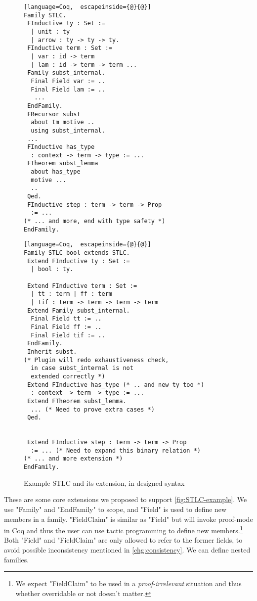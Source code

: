 \begin{figure}[!htb]
  \begin{minipage}[t]{0.47\linewidth}
\begin{lstlisting}[language=Coq,  escapeinside={@}{@}]
Family STLC.
 FInductive ty : Set :=
  | unit : ty
  | arrow : ty -> ty -> ty.
 FInductive term : Set := 
  | var : id -> term 
  | lam : id -> term -> term ...
 Family subst_internal.
  Final Field var := ..
  Final Field lam := ..
   ...
 EndFamily.
 FRecursor subst
  about tm motive ..
  using subst_internal.
 ...
 FInductive has_type 
  : context -> term -> type := ...
 FTheorem subst_lemma 
  about has_type 
  motive ...
  ..
 Qed.
 FInductive step : term -> term -> Prop 
  := ...
(* ... and more, end with type safety *)
EndFamily.
\end{lstlisting}
  \end{minipage}
  \begin{minipage}[t]{0.47\linewidth}
\begin{lstlisting}[language=Coq,  escapeinside={@}{@}]
Family STLC_bool extends STLC.
 Extend FInductive ty : Set :=
  | bool : ty.

 Extend FInductive term : Set := 
  | tt : term | ff : term 
  | tif : term -> term -> term -> term
 Extend Family subst_internal.
  Final Field tt := ..
  Final Field ff := ..
  Final Field tif := ..
 EndFamily.
 Inherit subst.
(* Plugin will redo exhaustiveness check, 
  in case subst_internal is not 
  extended correctly *)
 Extend FInductive has_type (* .. and new ty too *)
  : context -> term -> type := ...
 Extend FTheorem subst_lemma.
  ... (* Need to prove extra cases *)
 Qed.


 Extend FInductive step : term -> term -> Prop 
  := ... (* Need to expand this binary relation *)
(* ... and more extension *)
EndFamily.
\end{lstlisting}
  \end{minipage}
  \caption{Example STLC and its extension, in designed syntax}\label{fig:STLC-example2}
\end{figure}

These are some core extensions we proposed to support \cref{fig:STLC-example}. We use "Family" and "EndFamily" to scope, and "Field" is used to define new members in a family. "FieldClaim" is similar as "Field" but will invoke proof-mode in Coq and thus the user can use tactic programming to define new members.\footnote{We expect "FieldClaim" to be used in a \textit{proof-irrelevant} situation and thus whether overridable or not doesn't matter.} Both "Field" and "FieldClaim" are only allowed to refer to the former fields, to avoid possible inconsistency mentioned in \ref{chg:consistency}.
We can define nested families.

